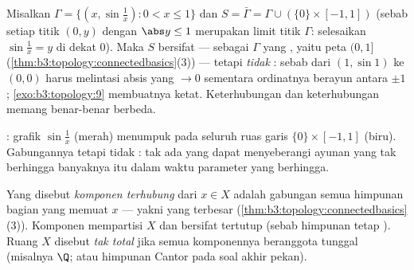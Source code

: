 \begin{example}
\label{ex:b3:topology:sinecurve}
Misalkan $\Gamma = \{(x, \sin\frac1x) : 0 < x \leq 1\}$ dan $S =
\bar\Gamma = \Gamma \cup (\{0\}\times[-1,1])$ (sebab setiap titik $(0,
y)$ dengan $\abs y \leq 1$ merupakan limit titik $\Gamma$: selesaikan
$\sin\frac1x = y$ di dekat $0$). Maka $S$ bersifat
\emph{} --- sebagai  $\Gamma$ yang , yaitu
peta  $(0, 1]$
(\cref{thm:b3:topology:connectedbasics}(3)) --- tetapi \emph{tidak
}: sebab  dari $(1, \sin 1)$ ke $(0,0)$ harus
melintasi absis yang $\to 0$ sementara ordinatnya berayun
antara $\pm1$; \cref{exo:b3:topology:9} membuatnya ketat.
Keterhubungan dan keterhubungan  memang benar-benar
berbeda.
\end{example}

\begin{omfigure}

{\small {}: grafik
$\sin\frac1x$ (merah) menumpuk pada seluruh ruas garis
$\{0\}\times[-1,1]$ (biru). Gabungannya  tetapi tidak
: tak ada   yang dapat menyeberangi ayunan
yang tak berhingga banyaknya itu dalam waktu parameter yang berhingga.}
\end{omfigure}

\begin{definition}\label{def:b3:topology:components}
Yang disebut \emph{komponen terhubung} dari $x
\in X$ adalah gabungan semua himpunan bagian  yang memuat $x$ ---
yakni yang terbesar (\cref{thm:b3:topology:connectedbasics}(3)).
Komponen mempartisi $X$ dan bersifat tertutup (sebab  himpunan
 tetap ). Ruang $X$ disebut \emph{tak  total} jika semua
komponennya beranggota tunggal (misalnya $\Q$; atau himpunan Cantor pada soal akhir
pekan).
\end{definition}

